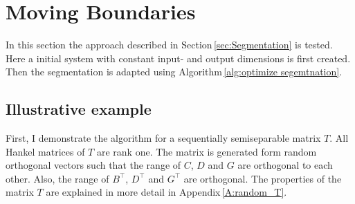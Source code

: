 \documentclass[doctype=mastersthesis,BCOR=15mm,biblatex]{ldvbook}%
\begin{document}
\section{Moving Boundaries}
In this section the approach described in Section\,\ref{sec:Segmentation} is tested.
Here a initial system with constant input- and output dimensions is first created.
Then the segmentation is adapted using Algorithm\,\ref{alg:optimize segemtnation}.

\subsection{Illustrative example}\label{sec:test_adao}
First, I demonstrate the algorithm for a sequentially semiseparable matrix $T$.
All Hankel matrices of $T$ are rank one. 
The matrix is generated form random orthogonal vectors such that the range of $C$, $D$ and $G$ are orthogonal to each other.
Also, the range of $B^\top$, $D^\top$ and $G^\top$ are orthogonal.
The properties of the matrix $T$ are explained in more detail in Appendix\,\ref{A:random_T}.
\end{document}
